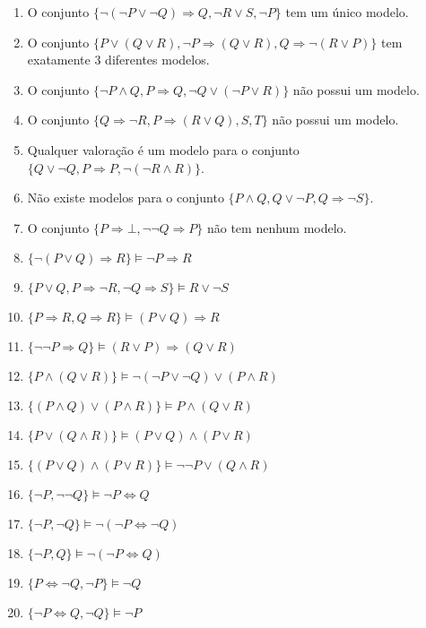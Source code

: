 \begin{enumerate}
    \item O conjunto $\{\neg (\neg P \lor \neg Q) \Rightarrow Q, \neg R \lor S, \neg P \}$ tem um único modelo.
    \item O conjunto $\{P \lor (Q \lor R), \neg P \Rightarrow (Q \lor R), Q \Rightarrow \neg(R \lor P)\}$ tem exatamente 3 diferentes modelos.
    \item O conjunto $\{\neg P \land Q, P \Rightarrow Q, \neg Q \lor (\neg P \lor R)\}$ não possui um modelo.
    \item O conjunto $\{Q \Rightarrow \neg R, P \Rightarrow (R \lor Q), S, T\}$ não possui um modelo.
    \item Qualquer valoração é um modelo para o conjunto $\{Q \lor \neg Q, P \Rightarrow P, \neg (\neg R \land R)\}$.
    \item Não existe modelos para o conjunto $\{P \land Q, Q \lor \neg P, Q \Rightarrow \neg S\}$.
    \item O conjunto $\{P \Rightarrow \bot, \neg \neg Q \Rightarrow P\}$ não tem nenhum modelo.
    \item $\{\neg (P \lor Q) \Rightarrow R\} \vDash \neg P \Rightarrow R$
    \item $\{P \lor Q, P \Rightarrow \neg R, \neg Q \Rightarrow S\} \vDash R \lor \neg S$
    \item $\{P \Rightarrow R, Q \Rightarrow R\} \vDash (P \lor Q) \Rightarrow R$
    \item $\{\neg \neg P \Rightarrow Q\} \vDash (R \lor P) \Rightarrow (Q \lor R)$
    \item $\{P \land (Q \lor R)\} \vDash \neg (\neg P \lor \neg Q) \lor (P \land R)$
    \item $\{(P \land Q) \lor (P \land R)\} \vDash P \land (Q \lor R)$
    \item $\{P \lor (Q \land R)\} \vDash (P \lor Q) \land (P \lor R)$
    \item $\{(P \lor Q) \land (P \lor R)\} \vDash \neg \neg P \lor (Q \land R)$
    \item $\{\neg P, \neg \neg Q\} \vDash \neg P \Leftrightarrow Q$
    \item $\{\neg P, \neg Q\} \vDash \neg (\neg P \Leftrightarrow \neg Q)$
    \item $\{\neg P, Q\} \vDash \neg (\neg P \Leftrightarrow Q)$
    \item $\{P \Leftrightarrow \neg Q, \neg P\} \vDash \neg Q$
    \item $\{\neg P \Leftrightarrow Q, \neg Q\} \vDash \neg P$
\end{enumerate}

